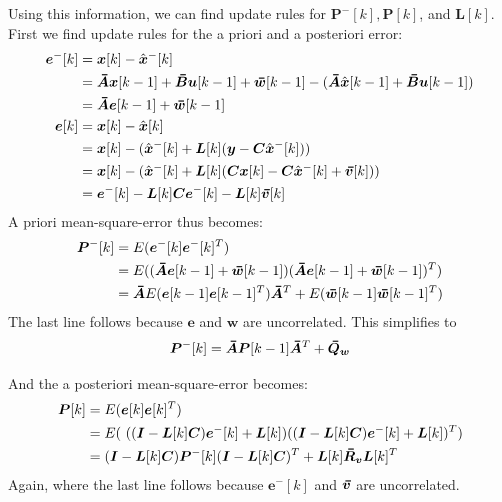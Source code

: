 Using this information, we can find update rules for $\bm{P}^-[k], \bm{P}[k]$, and $\bm{L}[k]$. First we find update rules for the a priori and a posteriori error:
\begin{align*}
    \bm{e}^-[k] &= \bm{x}[k]-\hat{\bm{x}}^-[k] \\
                &= \thickbar{\bm{A}}\bm{x}[k-1] + \thickbar{\bm{B}}\bm{u}[k-1] + \thickbar{\bm{w}}[k-1] - (\thickbar{\bm{A}}\hat{\bm{x}}[k-1] + \thickbar{\bm{B}}\bm{u}[k-1]) \\
                &= \thickbar{\bm{A}}\bm{e}[k-1] + \thickbar{\bm{w}}[k-1] \\
    \bm{e}[k]&= \bm{x}[k] -\hat{\bm{x}}[k] \\
             &= \bm{x}[k] - (\bmhat{x}^-[k]+\bm{L}[k](\bm{y}-\bm{C}\bmhat{x}^-[k])) \\
             &= \bm{x}[k] - (\bmhat{x}^-[k]+\bm{L}[k](\bm{C}\bm{x}[k] -\bm{C}\bmhat{x}^-[k]+\bmbar{v}[k])) \\
             &= \bm{e}^-[k] - \bm{L}[k]\bm{C}\bm{e}^-[k]-\bm{L}[k]\bmbar{v}[k]
\end{align*}
A priori mean-square-error thus becomes:
\begin{align*}
    \bm{P}^-[k] &= E(\bm{e}^-[k]\bm{e}^-[k]^T) \\
                &= E((\thickbar{\bm{A}}\bm{e}[k-1] + \thickbar{\bm{w}}[k-1])(\thickbar{\bm{A}}\bm{e}[k-1] + \thickbar{\bm{w}}[k-1])^T) \\
                &= \thickbar{\bm{A}}E(\bm{e}[k-1]\bm{e}[k-1]^T)\thickbar{\bm{A}}^T + E(\thickbar{\bm{w}}[k-1]\thickbar{\bm{w}}[k-1]^T)
\end{align*}
The last line follows because $\bm{e}$ and $\bm{w}$ are uncorrelated. This simplifies to
\begin{equation}
\bm{P}^-[k] = \thickbar{\bm{A}}\bm{P}[k-1]\thickbar{\bm{A}}^T + \thickbar{\bm{Q}}_{\bm{w}}
\end{equation}

And the a posteriori mean-square-error becomes:
\begin{align*}
    \bm{P}[k] &= E(\bm{e}[k]\bm{e}[k]^T) \\
              &= E(\ ((\bm{I} - \bm{L}[k]\bm{C})\bm{e}^-[k]+\bm{L}[k])((\bm{I} - \bm{L}[k]\bm{C})\bm{e}^-[k]+\bm{L}[k])^T) \\
              &= (\bm{I} - \bm{L}[k]\bm{C})\bm{P}^-[k](\bm{I} - \bm{L}[k]\bm{C})^T + \bm{L}[k]\bmbar{R}_{\bm{v}}\bm{L}[k]^T
\end{align*}
Again, where the last line follows because $\bm{e}^-[k]$ and $\bmbar{v}$ are uncorrelated.

